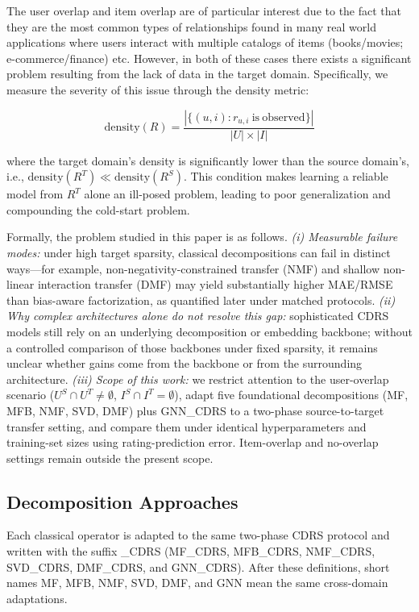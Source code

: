 \documentclass[pdflatex,sn-mathphys-num]{sn-jnl}%
\theoremstyle{thmstyleone}%
\theoremstyle{thmstyletwo}%
\theoremstyle{thmstylethree}%
\begin{document}
The user overlap and item overlap are of particular interest due to the fact that they are the most common types of relationships found in many real world applications where users interact with multiple catalogs of items (books/movies; e-commerce/finance) etc. However, in both of these cases there exists a significant problem resulting from the lack of data in the target domain. Specifically, we measure the severity of this issue through the density metric:

\begin{equation}
\mathrm{density}(R) = \frac{|\{(u,i): r_{u,i} \mathrm{\ is\ observed} \}|}{|U| \times |I|}
\end{equation}

where the target domain's density is significantly lower than the source domain's, i.e., $\mathrm{density}(R^T) \ll \mathrm{density}(R^S)$. This condition makes learning a reliable model from $R^T$ alone an ill-posed problem, leading to poor generalization and compounding the cold-start problem.

Formally, the problem studied in this paper is as follows. \emph{(i) Measurable failure modes:} under high target sparsity, classical decompositions can fail in distinct ways---for example, non-negativity-constrained transfer (NMF) and shallow non-linear interaction transfer (DMF) may yield substantially higher MAE/RMSE than bias-aware factorization, as quantified later under matched protocols. \emph{(ii) Why complex architectures alone do not resolve this gap:} sophisticated CDRS models still rely on an underlying decomposition or embedding backbone; without a controlled comparison of those backbones under fixed sparsity, it remains unclear whether gains come from the backbone or from the surrounding architecture. \emph{(iii) Scope of this work:} we restrict attention to the user-overlap scenario ($U^S \cap U^T \neq \emptyset$, $I^S \cap I^T = \emptyset$), adapt five foundational decompositions (MF, MFB, NMF, SVD, DMF) plus GNN\_CDRS to a two-phase source-to-target transfer setting, and compare them under identical hyperparameters and training-set sizes using rating-prediction error. Item-overlap and no-overlap settings remain outside the present scope.

\subsection{Decomposition Approaches}
Each classical operator is adapted to the same two-phase CDRS protocol and written with the suffix \_CDRS (MF\_CDRS, MFB\_CDRS, NMF\_CDRS, SVD\_CDRS, DMF\_CDRS, and GNN\_CDRS). After these definitions, short names MF, MFB, NMF, SVD, DMF, and GNN mean the same cross-domain adaptations.
\end{document}
